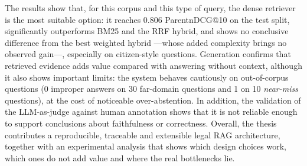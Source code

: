 \documentclass[
paper=a4,
fontsize=12pt,
twoside,
openright,                  %
titlepage,                  %
headsepline,                %
footheight=16pt,            %
parskip=half+,				%
numbers=noenddot,			%
headinclude=true,           %
footinclude=true,           %
cleardoublepage=empty,      %
captions=tableheading,      %
BCOR=5mm, 				    %
DIV=9   			        %
usegeometry=true			%
]{scrbook}
\begin{document}
The results show that, for this corpus and this type of query, the dense retriever is the most suitable option: it reaches 0.806 ParentnDCG@10 on the test split, significantly outperforms BM25 and the RRF hybrid, and shows no conclusive difference from the best weighted hybrid —whose added complexity brings no observed gain—, especially on citizen-style questions. Generation confirms that retrieved evidence adds value compared with answering without context, although it also shows important limits: the system behaves cautiously on out-of-corpus questions (0 improper answers on 30 far-domain questions and 1 on 10 \emph{near-miss} questions), at the cost of noticeable over-abstention. In addition, the validation of the LLM-as-judge against human annotation shows that it is not reliable enough to support conclusions about faithfulness or correctness. Overall, the thesis contributes a reproducible, traceable and extensible legal RAG architecture, together with an experimental analysis that shows which design choices work, which ones do not add value and where the real bottlenecks lie.



\restoregeometry



\tableofcontents 

\cleardoublepage
\listoffigures %

\cleardoublepage
\listoftables %
\end{document}
